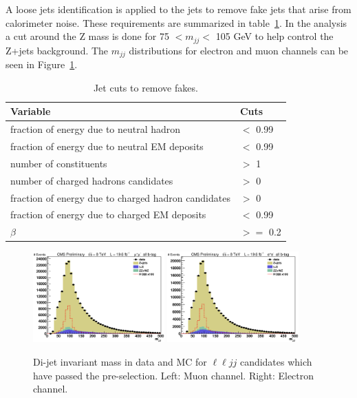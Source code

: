 A loose jets identification is applied to the jets to remove fake jets that arise from calorimeter noise.  These requirements are summarized in table~\ref{tab:jetcuts}.  In the analysis a cut around the Z mass is done for 75 $< m_{jj} <$ 105 GeV to help control the Z+jets background.  The $m_{jj}$ distributions for electron and muon channels can be seen in Figure~\ref{fig:mjj}.
\begin{table}[htb!]
\caption{ 
Jet cuts to remove fakes.
}
\label{tab:jetcuts}
\vspace*{\medskipamount}
\begin{center}
\small
\begin{tabular}{|l|l|}
\hline
Variable & Cuts\\
\hline
fraction of energy due to neutral hadron & $<$ 0.99 \\
fraction of energy due to neutral EM deposits & $<$ 0.99 \\
number of constituents & $>$ 1 \\
number of charged hadrons candidates & $>$ 0 \\
fraction of energy due to charged hadron candidates & $>$ 0 \\
fraction of energy due to charged EM deposits & $<$ 0.99 \\
$\beta$ & $>=$ 0.2  \\
\hline
\end{tabular}
\end{center}
\end{table}

\begin{figure}[htb]
\begin{center}
\centerline{
\includegraphics[width=0.45\textwidth]{presentation/defense/images/preselection/mu/mJJ.eps}
\includegraphics[width=0.45\textwidth]{presentation/defense/images/preselection/el/mJJ.eps}
}
\caption{
Di-jet invariant mass in data and MC for $\ell \ell jj$ candidates which have passed the pre-selection. Left: Muon channel. Right: Electron channel.
}
\label{fig:mjj}
\end{center}
\end{figure}

